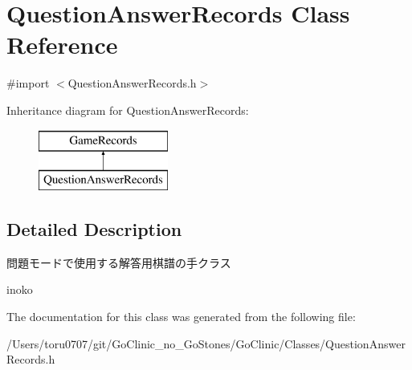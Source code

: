 \hypertarget{interface_question_answer_records}{
\section{QuestionAnswerRecords Class Reference}
\label{interface_question_answer_records}
}


{\ttfamily \#import $<$QuestionAnswerRecords.h$>$}

Inheritance diagram for QuestionAnswerRecords:\begin{figure}[H]
\begin{center}
\leavevmode
\includegraphics[height=2.000000cm]{interface_question_answer_records}
\end{center}
\end{figure}


\subsection{Detailed Description}
問題モードで使用する解答用棋譜の手クラス

inoko 

The documentation for this class was generated from the following file:\begin{DoxyCompactItemize}
\item 
/Users/toru0707/git/GoClinic\_\-no\_\-GoStones/GoClinic/Classes/QuestionAnswerRecords.h\end{DoxyCompactItemize}
